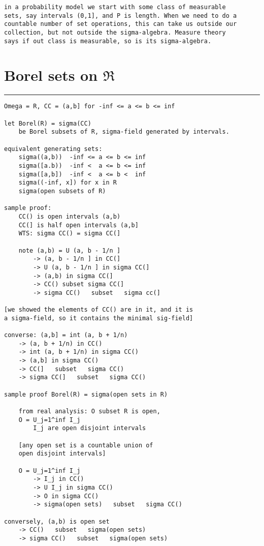 \documentclass{article}
\begin{document}
\begin{flushleft}
\begin{verbatim}
in a probability model we start with some class of measurable 
sets, say intervals (0,1], and P is length. When we need to do a 
countable number of set operations, this can take us outside our 
collection, but not outside the sigma-algebra. Measure theory 
says if out class is measurable, so is its sigma-algebra.
\end{verbatim}

\section*{Borel sets on $\mathfrak{R}$}
\bigbreak
\hrule
\bigbreak

\begin{verbatim}
Omega = R, CC = (a,b] for -inf <= a <= b <= inf

let Borel(R) = sigma(CC)
    be Borel subsets of R, sigma-field generated by intervals.

equivalent generating sets:
    sigma((a,b))  -inf <= a <= b <= inf
    sigma([a.b))  -inf <  a <= b <= inf
    sigma([a,b])  -inf <  a <= b <  inf
    sigma((-inf, x]) for x in R
    sigma(open subsets of R)

sample proof:
    CC() is open intervals (a,b)
    CC(] is half open intervals (a,b]
    WTS: sigma CC() = sigma CC(]

    note (a,b) = U (a, b - 1/n ]
        -> (a, b - 1/n ] in CC(]
        -> U (a, b - 1/n ] in sigma CC(]
        -> (a,b) in sigma CC(]
        -> CC() subset sigma CC(]
        -> sigma CC()   subset   sigma cc(]

[we showed the elements of CC() are in it, and it is 
a sigma-field, so it contains the minimal sig-field]

converse: (a,b] = int (a, b + 1/n)
    -> (a, b + 1/n) in CC()
    -> int (a, b + 1/n) in sigma CC()
    -> (a,b] in sigma CC()
    -> CC(]   subset   sigma CC()
    -> sigma CC(]   subset   sigma CC()

sample proof Borel(R) = sigma(open sets in R)

    from real analysis: O subset R is open, 
    O = U_j=1^inf I_j 
        I_j are open disjoint intervals

    [any open set is a countable union of 
    open disjoint intervals]

    O = U_j=1^inf I_j
        -> I_j in CC()
        -> U I_j in sigma CC()
        -> O in sigma CC()
        -> sigma(open sets)   subset   sigma CC()

conversely, (a,b) is open set
    -> CC()   subset   sigma(open sets)
    -> sigma CC()   subset   sigma(open sets)


\end{verbatim}
\end{flushleft}
\end{document}
